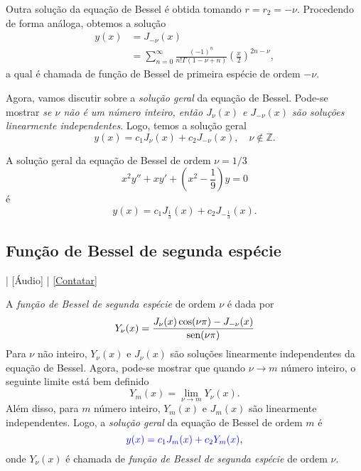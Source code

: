  Outra solução da equação de Bessel é obtida tomando $r=r_2=-\nu$. Procedendo de forma análoga, obtemos a solução
  \begin{align}
    y(x) &= J_{-\nu}(x)\\
    &= \sum_{n=0}^\infty \frac{(-1)^n}{n!\Gamma(1-\nu+n)}\left(\frac{x}{2}\right)^{2n-\nu},
  \end{align}
  a qual é chamada de função de Bessel de primeira espécie de ordem $-\nu$.

  Agora, vamos discutir sobre a \emph{solução geral} da equação de Bessel. Pode-se mostrar \emph{se $\nu$ não é um número inteiro, então $J_\nu(x)$ e $J_{-\nu}(x)$ são soluções linearmente independentes}. Logo, temos a solução geral
  \begin{equation}
    y(x) = c_1J_\nu(x) + c_2J_{-\nu}(x),\quad \nu\not\in\mathbb{Z}.
  \end{equation}

  \begin{ex}
    A solução geral da equação de Bessel de ordem $\nu=1/3$
    \begin{equation}
      x^2y'' + xy' + \left(x^2 - \frac{1}{9}\right)y = 0
    \end{equation}
    é
    \begin{equation}
      y(x) = c_1J_{\frac{1}{3}}(x) + c_2J_{-\frac{1}{3}}(x).
    \end{equation}
  \end{ex}

  \subsection{Função de Bessel de segunda espécie}

  \begin{flushright}
    [Vídeo] | [Áudio] | \href{https://phkonzen.github.io/notas/contato.html}{[Contatar]}
  \end{flushright}
  
  A \emph{função de Bessel de segunda espécie} de ordem $\nu$ é dada por
  \begin{equation}
    Y_\nu(x) = \frac{J_\nu(x)\cos(\nu\pi)-J_{-\nu}(x)}{\operatorname{sen}(\nu\pi)}
  \end{equation}
  Para $\nu$ não inteiro, $Y_\nu(x)$ e $J_\nu(x)$ são soluções linearmente independentes da equação de Bessel. Agora, pode-se mostrar que quando $\nu\to m$ número inteiro, o seguinte limite está bem definido
  \begin{equation}
    Y_m(x) = \lim_{\nu\to m} Y_\nu(x).
  \end{equation}
  Além disso, para $m$ número inteiro, $Y_m(x)$ e $J_m(x)$ são linearmente independentes. Logo, a \emph{solução geral} da equação de Bessel de ordem $m$ é
  \begin{equation}
    {\color{blue}y(x) = c_1J_m(x) + c_2Y_m(x)},
  \end{equation}
  onde $Y_\nu(x)$ é chamada de \emph{função de Bessel de segunda espécie} de ordem $\nu$.

